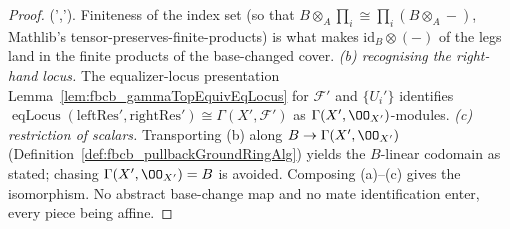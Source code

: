\begin{lemma}
\begin{proof}
    \cong {}(',')\).
    Finiteness of the index set (so that \(B\otimes_A\prod_i \cong \prod_i (B\otimes_A -)\),
    Mathlib's tensor-preserves-finite-products) is what makes \(\mathrm{id}_B\otimes(-)\) of
    the legs land in the finite products of the base-changed cover.
    \emph{(b) recognising the right-hand locus.} The equalizer-locus presentation
    Lemma~\ref{lem:fbcb_gammaTopEquivEqLocus} for \(\mathcal{F}'\) and \(\{U_i'\}\) identifies
    \(\operatorname{eqLocus}(\mathrm{leftRes}',\mathrm{rightRes}') \cong \Gamma(X',\mathcal{F}')\)
    as \(\Gamma(X',\OO_{X'})\)-modules.
    \emph{(c) restriction of scalars.} Transporting (b) along \(B \to \Gamma(X',\OO_{X'})\)
    (Definition~\ref{def:fbcb_pullbackGroundRingAlg}) yields the \(B\)-linear codomain as
    stated; chasing \(\Gamma(X',\OO_{X'}) = B\) is avoided. Composing (a)–(c) gives the
    isomorphism. No abstract base-change map and no mate identification enter, every piece
    being affine.
  \end{proof}
\end{lemma}

